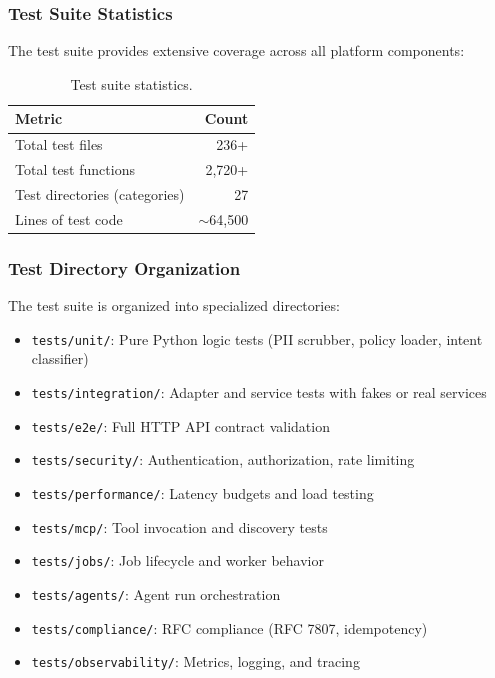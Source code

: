 \subsubsection{Test Suite Statistics}

The test suite provides extensive coverage across all platform components:

\begin{table}[ht]
\centering
\caption{Test suite statistics.}
\label{tab:test-stats}
\begin{tabular}{lr}
\hline
\textbf{Metric} & \textbf{Count} \\
\hline
Total test files & 236+ \\
Total test functions & 2,720+ \\
Test directories (categories) & 27 \\
Lines of test code & $\sim$64,500 \\
\hline
\end{tabular}
\end{table}

\subsubsection{Test Directory Organization}

The test suite is organized into specialized directories:

\begin{itemize}
    \item \texttt{tests/unit/}: Pure Python logic tests (PII scrubber, policy loader, intent classifier)
    \item \texttt{tests/integration/}: Adapter and service tests with fakes or real services
    \item \texttt{tests/e2e/}: Full HTTP API contract validation
    \item \texttt{tests/security/}: Authentication, authorization, rate limiting
    \item \texttt{tests/performance/}: Latency budgets and load testing
    \item \texttt{tests/mcp/}: Tool invocation and discovery tests
    \item \texttt{tests/jobs/}: Job lifecycle and worker behavior
    \item \texttt{tests/agents/}: Agent run orchestration
    \item \texttt{tests/compliance/}: RFC compliance (RFC 7807, idempotency)
    \item \texttt{tests/observability/}: Metrics, logging, and tracing
\end{itemize}

